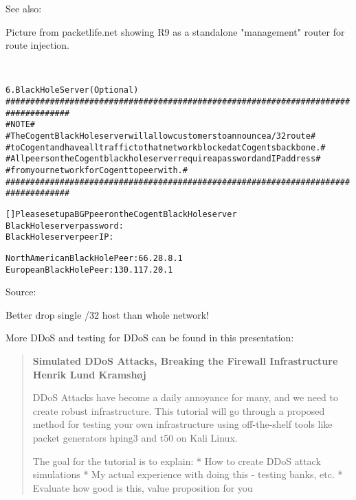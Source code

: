 \documentclass[Screen16to9,17pt]{foils}
\begin{document}
See also: {\small{}}



Picture from packetlife.net showing  R9 as a standalone "management" router for route injection.

{\footnotesize
{}\\
}



\begin{alltt}\footnotesize
6.  Black Hole Server (Optional)
   ###################################################################################
   #                           NOTE                                                  #
   #  The Cogent Black Hole server will allow customers to announce a /32 route      #
   #  to Cogent and have all traffic to that network blocked at Cogents backbone.    #
   #  All peers on the Cogent black hole server require a password and IP address    #
   #  from your network for Cogent to peer with.                                     #
   ###################################################################################

       [   ]  Please set up a BGP peer on the Cogent Black Hole server
       Black Hole server password:
       Black Hole server peer IP:

       North American Black Hole Peer:  66.28.8.1
       European Black Hole Peer:  130.117.20.1
\end{alltt}

Source:\\
{\footnotesize{}}

\centerline{Better drop single /32 host than whole network!}


More DDoS and testing for DDoS can be found in this presentation:
\begin{quote}\footnotesize{\bf
Simulated DDoS Attacks, Breaking the Firewall Infrastructure
Henrik Lund Kramshøj}

DDoS Attacks have become a daily annoyance for many, and we need to create robust infrastructure. This tutorial will go through a proposed method for testing your own infrastructure using off-the-shelf tools like packet generators hping3 and t50 on Kali Linux.

The goal for the tutorial is to explain:
* How to create DDoS attack simulations
* My actual experience with doing this - testing banks, etc.
* Evaluate how good is this, value proposition for you
\end{quote}
\end{document}
